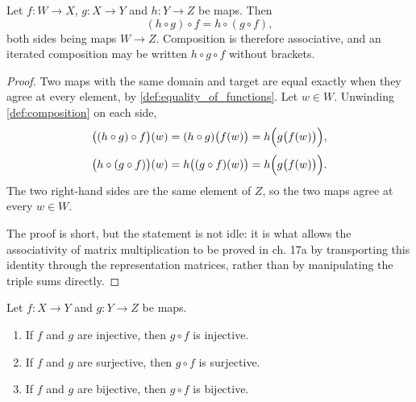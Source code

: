 \begin{ailemma}
\label{ailem:composition_associative}
Let $f \colon W \to X$, $g \colon X \to Y$ and $h \colon Y \to Z$ be maps. Then
\[
    (h \circ g) \circ f = h \circ (g \circ f),
\]
both sides being maps $W \to Z$. Composition is therefore associative, and an iterated composition may be written $h \circ g \circ f$ without brackets.
\end{ailemma}

\begin{proof}
Two maps with the same domain and target are equal exactly when they agree at every element, by \cref{def:equality_of_functions}. Let $w \in W$. Unwinding \cref{def:composition} on each side,
\[
    \bigl((h \circ g) \circ f\bigr)(w) = (h \circ g)\bigl(f(w)\bigr) = h\Bigl(g\bigl(f(w)\bigr)\Bigr),
\]
\[
    \bigl(h \circ (g \circ f)\bigr)(w) = h\bigl((g \circ f)(w)\bigr) = h\Bigl(g\bigl(f(w)\bigr)\Bigr).
\]
The two right-hand sides are the same element of $Z$, so the two maps agree at every $w \in W$.

The proof is short, but the statement is not idle: it is what allows the associativity of matrix multiplication to be proved in ch. 17a by transporting this identity through the representation matrices, rather than by manipulating the triple sums directly.
\end{proof}

\begin{lemma}
\label{lem:composition_inj_surj}
Let $f: X \to Y$ and $g: Y \to Z$ be maps.
\begin{enumerate}[label=\textbf{(\alph*)}]
    \item If $f$ and $g$ are injective, then $g \circ f$ is injective.
    \item If $f$ and $g$ are surjective, then $g \circ f$ is surjective.
    \item If $f$ and $g$ are bijective, then $g \circ f$ is bijective.
\end{enumerate}
\end{lemma}

